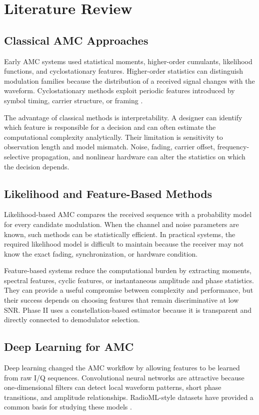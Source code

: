 \documentclass[12pt,twoside,openright]{report}
\begin{document}
\chapter{Literature Review}

\section{Classical AMC Approaches}
Early AMC systems used statistical moments, higher-order cumulants,
likelihood functions, and cyclostationary features. Higher-order statistics
can distinguish modulation families because the distribution of a received
signal changes with the waveform. Cyclostationary methods exploit periodic
features introduced by symbol timing, carrier structure, or framing
\cite{gardner1988,azzouznandi1996}.

The advantage of classical methods is interpretability. A designer can
identify which feature is responsible for a decision and can often estimate
the computational complexity analytically. Their limitation is sensitivity
to observation length and model mismatch. Noise, fading, carrier offset,
frequency-selective propagation, and nonlinear hardware can alter the
statistics on which the decision depends.

\section{Likelihood and Feature-Based Methods}
Likelihood-based AMC compares the received sequence with a probability model
for every candidate modulation. When the channel and noise parameters are
known, such methods can be statistically efficient. In practical systems,
the required likelihood model is difficult to maintain because the receiver
may not know the exact fading, synchronization, or hardware condition.

Feature-based systems reduce the computational burden by extracting moments,
spectral features, cyclic features, or instantaneous amplitude and phase
statistics. They can provide a useful compromise between complexity and
performance, but their success depends on choosing features that remain
discriminative at low SNR. Phase II uses a constellation-based estimator
because it is transparent and directly connected to demodulator selection.

\section{Deep Learning for AMC}
Deep learning changed the AMC workflow by allowing features to be learned
from raw I/Q sequences. Convolutional neural networks are attractive because
one-dimensional filters can detect local waveform patterns, short phase
transitions, and amplitude relationships. RadioML-style datasets have
provided a common basis for studying these models
\cite{oshea2016convolutional,oshea2016generative}.
\end{document}
